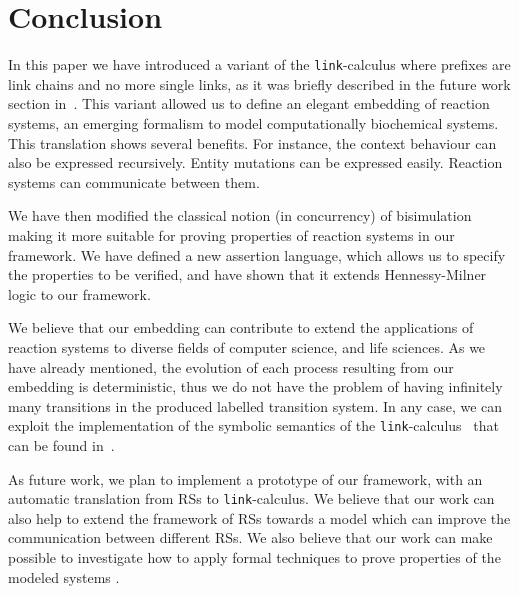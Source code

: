 
\section{Conclusion}\label{sec:conclusion}

In this paper we have introduced a variant of the {\tt link}-calculus
where prefixes are link chains and no more single links, as it was 
briefly described in the future work section in~\cite{BBB17}.
This variant allowed us to define 
an elegant embedding of reaction systems,
an emerging formalism to model computationally biochemical systems.
This translation shows several benefits.
For instance, the context behaviour can also be expressed recursively. 
Entity mutations can be expressed easily. Reaction systems can
communicate between them.

We have then modified the classical notion (in concurrency) of bisimulation
making it more suitable for proving properties of reaction systems in our
framework.
We have defined a new assertion language, which allows us to specify
the properties to be verified, and have shown that it extends Hennessy-Milner logic
to our framework.

We believe that our embedding can contribute to extend the applications
of reaction systems to diverse fields of computer science, and life
sciences.
As we have already mentioned, the evolution of each process resulting from our embedding 
is deterministic, thus we do not have the problem of having infinitely many transitions
in the produced labelled transition system. In any case, we can exploit the implementation of  the symbolic semantics of the {\tt link}-calculus~\cite{BrodoO17} that can be found in~\cite{tool}.


As future work, we plan to implement a prototype of our framework,
with an automatic translation from RSs to  {\tt link}-calculus. 
We believe that our work can also help to extend the framework
of RSs towards a model which can improve the communication
between different RSs. We also believe that our work can make 
possible to investigate how to apply formal techniques to prove 
properties of the
modeled systems \cite{CFHOT15,OCHF16,BBGLBH2017}.
